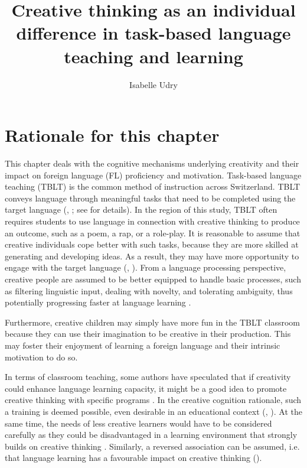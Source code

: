 \documentclass[output=paper]{langsci/langscibook}
\author{Isabelle Udry\orcid{}\affiliation{University of Fribourg, Institut de Plurilinguisme; Zurich University of Teacher Education}}
\title[Creative thinking in task-based language teaching]
      {Creative thinking as an individual difference in task-based language teaching and learning}
\begin{document}
\maketitle 

\section{Rationale for this chapter}\label{sec:06:1}

This chapter deals with the cognitive mechanisms underlying creativity and their impact on foreign language (FL) proficiency and motivation. Task-based language teaching (TBLT) is the common method of instruction across Switzerland. TBLT conveys language through meaningful tasks that need to be completed using the target language (\citealt{Willis1996}, \citealt{Ellis2017}; see  for details). In the region of this study, TBLT often requires students to use language in connection with creative thinking to produce an outcome, such as a poem, a rap, or a role-play. It is reasonable to assume that creative individuals cope better with such tasks, because they are more skilled at generating and developing ideas. As a result, they may have more opportunity to engage with the target language (\citealt{Otto1998}, \citealt{Albert2006}). From a language processing perspective, creative people are assumed to be better equipped to handle basic processes, such as filtering linguistic input, dealing with novelty, and tolerating ambiguity, thus potentially progressing faster at language learning \citep{Kharkhurin2012}. 

Furthermore, creative children may simply have more fun in the TBLT classroom because they can use their imagination to be creative in their production. This may foster their enjoyment of learning a foreign language and their intrinsic motivation to do so.

In terms of classroom teaching, some authors have speculated that if creativity could enhance language learning capacity, it might be a good idea to promote creative thinking with specific programs \citep{Kharkhurin2012}. In the creative cognition rationale, such a training is deemed possible, even desirable in an educational context (\citealt{FinkeEtAl1992}, \citealt{Vogt2010}). At the same time, the needs of less creative learners would have to be considered carefully as they could be disadvantaged in a learning environment that strongly builds on creative thinking \citep{Otto1998}. Similarly, a reversed association can be assumed, i.e. that language learning has a favourable impact on creative thinking (\citealt{GhonsoolyShowqi2012}). 
\end{document}
